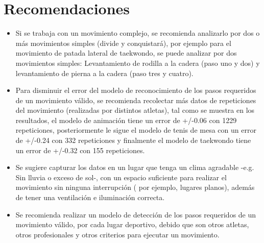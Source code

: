\section{Recomendaciones} \label{ded:rec}
\begin{itemize}
\item Si se trabaja con un movimiento complejo, se recomienda analizarlo por dos o m\'as movimientos simples (divide y conquistar\'a), por ejemplo para el movimiento de patada lateral de taekwondo, se puede analizar por dos movimientos simples: Levantamiento de rodilla a la cadera (paso uno y dos) y levantamiento de pierna a la cadera (paso tres y cuatro).
\item Para disminuir el error del modelo de reconocimiento de los pasos requeridos de un  movimiento v\'alido, se recomienda recolectar m\'as  datos de  repeticiones del movimiento (realizadas por distintos atletas), tal como se muestra en los resultados, el modelo de animaci\'on tiene un error de +/-0.06  con 1229 repeticiones, posteriormente le sigue el modelo de tenis de mesa con un error de +/-0.24 con 332 repeticiones y finalmente el modelo de taekwondo tiene un error de +/-0.32 con 155 repeticiones.
\item Se sugiere capturar los datos en un  lugar que tenga un clima agradable -e.g. Sin lluvia o exceso de sol-, con un espacio suficiente para realizar el movimiento sin ninguna interrupci\'on ( por ejemplo, lugares planos), adem\'as de tener una  ventilaci\'on e iluminaci\'on correcta.
\item Se recomienda realizar un modelo de detecci\'on de los pasos requeridos de un movimiento v\'alido, por cada lugar deportivo, debido que son otros atletas, otros profesionales y otros  criterios para ejecutar un movimiento.
\end{itemize}